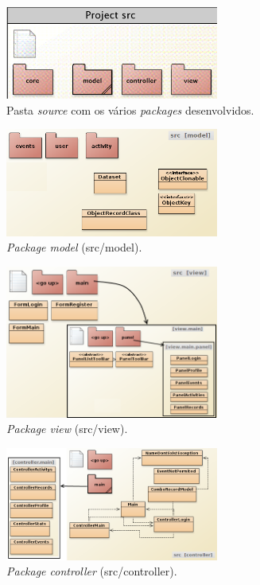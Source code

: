 \documentclass[a4paper,10pt]{report}
\begin{document}
\begin{figure}
\centering
\includegraphics[width=7cm]{src.png}
\caption{Pasta \emph{source} com os vários \emph{packages} desenvolvidos.}
\label{fig:src}
\end{figure}

\begin{figure}
\centering
\includegraphics[width=7cm]{model.png}
\caption{\emph{Package model} (src/model).}
\label{fig:model}
\end{figure}

\begin{figure}
\centering
\includegraphics[width=7cm]{view.png}
\caption{\emph{Package view} (src/view).}
\label{fig:view}
\end{figure}

\begin{figure}
\centering
\includegraphics[width=7cm]{controller.png}
\caption{\emph{Package controller} (src/controller).}
\label{fig:controller}
\end{figure}
\end{document}
